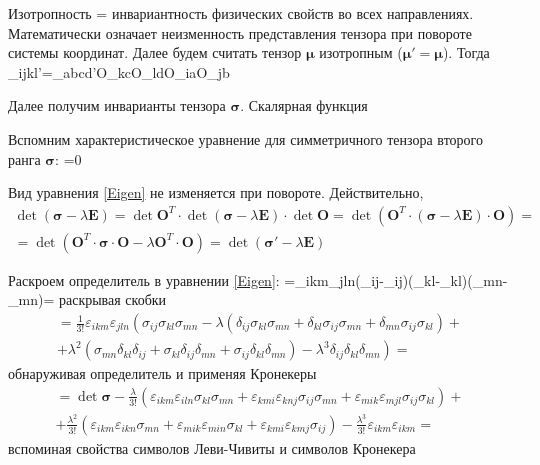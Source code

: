 \documentclass[main.tex]{subfiles}
\begin{document}
Изотропность = инвариантность физических свойств во всех направлениях. Математически означает неизменность представления тензора при повороте системы координат. Далее будем считать тензор $\symbf{\mu}$ изотропным ($\symbf{\mu}'=\symbf{\mu}$). Тогда
\beq\label{IsotropicTensor}
\mu_{ijkl}'=\mu_{abcd}'O_{kc}O_{ld}O_{ia}O_{jb}
\eeq

Далее получим инварианты тензора $\symbf{\sigma}$. Скалярная функция 

Вспомним характеристическое уравнение для симметричного тензора второго ранга $\symbf{\sigma}$:
\beq\label{Eigen}
=0
\eeq

Вид уравнения \eqref{Eigen} не изменяется при повороте. Действительно,
\begin{multline}\label{StableProve}
\det{\left(\symbf{\sigma}-\lambda\symbf{E}\right)}=\det{\symbf{O}^T}\cdot\det{\left(\symbf{\sigma}-\lambda\symbf{E}\right)}\cdot\det{\symbf{O}}=\det{\left(\symbf{O}^T\cdot\left(\symbf{\sigma}-\lambda\symbf{E}\right)\cdot\symbf{O}\right)}=\\=\det{\left(\symbf{O}^T\cdot\symbf{\sigma}\cdot\symbf{O}-\lambda\symbf{O}^T\cdot\symbf{O}\right)}=\det{\left(\symbf{\sigma}'-\lambda\symbf{E}\right)}
\end{multline}

Раскроем определитель в уравнении \eqref{Eigen}:
\beq
{}=\varepsilon_{ikm}\varepsilon_{jln}\left(\sigma_{ij}-\lambda\delta_{ij}\right)\left(\sigma_{kl}-\lambda\delta_{kl}\right)\left(\sigma_{mn}-\lambda\delta_{mn}\right)=
\eeq
раскрывая скобки
\begin{multline}
=\frac{1}{3!}\varepsilon_{ikm}\varepsilon_{jln}\left(\sigma_{ij}\sigma_{kl}\sigma_{mn}-\lambda\left(\delta_{ij}\sigma_{kl}\sigma_{mn}+\delta_{kl}\sigma_{ij}\sigma_{mn}+\delta_{mn}\sigma_{ij}\sigma_{kl}\right)+\right.\\\left.+\lambda^2\left(\sigma_{mn}\delta_{kl}\delta_{ij}+\sigma_{kl}\delta_{ij}\delta_{mn}+\sigma_{ij}\delta_{kl}\delta_{mn}\right)-\lambda^3\delta_{ij}\delta_{kl}\delta_{mn}\right)=
\end{multline}
обнаруживая определитель и применяя Кронекеры
\begin{multline}
=\det{\symbf{\sigma}}-\frac{\lambda}{3!}\left(\varepsilon_{ikm}\varepsilon_{iln}\sigma_{kl}\sigma_{mn}+\varepsilon_{kmi}\varepsilon_{knj}\sigma_{ij}\sigma_{mn}+\varepsilon_{mik}\varepsilon_{mjl}\sigma_{ij}\sigma_{kl}\right)+\\+\frac{\lambda^2}{3!}\left(\varepsilon_{ikm}\varepsilon_{ikn}\sigma_{mn}+\varepsilon_{mik}\varepsilon_{min}\sigma_{kl}+\varepsilon_{kmi}\varepsilon_{kmj}\sigma_{ij}\right)-\frac{\lambda^3}{3!}\varepsilon_{ikm}\varepsilon_{ikm}=
\end{multline}
вспоминая свойства символов Леви-Чивиты и символов Кронекера
\end{document}
